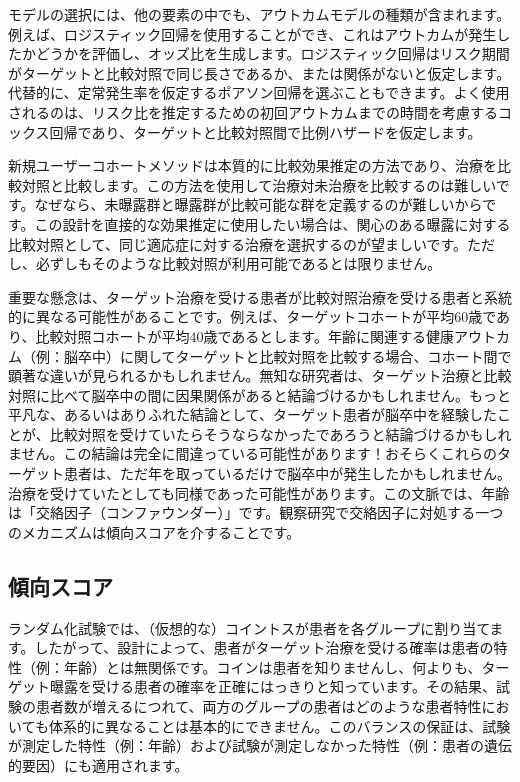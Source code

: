 \documentclass[
  11pt]{book}
\makeatletter
\newenvironment{kframe}{%
\medskip{}
\setlength{\fboxsep}{.8em}
 \def\at@end@of@kframe{}%
 \ifinner\ifhmode%
  \def\at@end@of@kframe{\end{minipage}}%
  \begin{minipage}{\columnwidth}%
 \fi\fi%
 \def\FrameCommand##1{\hskip\@totalleftmargin \hskip-\fboxsep
 \colorbox{myShadeColor}{##1}\hskip-\fboxsep
     \hskip-\linewidth \hskip-\@totalleftmargin \hskip\columnwidth}%
 \MakeFramed {\advance\hsize-\width
   \@totalleftmargin\z@ \linewidth\hsize
   \@setminipage}}%
 {\par\unskip\endMakeFramed%
 \at@end@of@kframe}
\newenvironment{rmdblock}[1]
  {
  \begin{itemize}
  \renewcommand{\labelitemi}{
    \raisebox{-.7\height}[0pt][0pt]{
      {\setkeys{Gin}{width=3em,keepaspectratio}\texttt{[image: images/\#1]}}
    }
  }
  \setlength{\fboxsep}{1em}
  \begin{kframe}
  \item
  }
  {
  \end{kframe}
  \end{itemize}
  }
\newenvironment{rmdimportant}
  {\begin{rmdblock}{important}}
  {\end{rmdblock}}
\theoremstyle{definition}
\theoremstyle{definition}
\theoremstyle{definition}
\theoremstyle{definition}
\theoremstyle{remark}
\makeatother
\begin{document}
モデルの選択には、他の要素の中でも、アウトカムモデルの種類が含まれます。例えば、ロジスティック回帰を使用することができ、これはアウトカムが発生したかどうかを評価し、オッズ比を生成します。ロジスティック回帰はリスク期間がターゲットと比較対照で同じ長さであるか、または関係がないと仮定します。代替的に、定常発生率を仮定するポアソン回帰を選ぶこともできます。よく使用されるのは、リスク比を推定するための初回アウトカムまでの時間を考慮するコックス回帰であり、ターゲットと比較対照間で比例ハザードを仮定します。    

\begin{rmdimportant}
新規ユーザーコホートメソッドは本質的に比較効果推定の方法であり、治療を比較対照と比較します。この方法を使用して治療対未治療を比較するのは難しいです。なぜなら、未曝露群と曝露群が比較可能な群を定義するのが難しいからです。この設計を直接的な効果推定に使用したい場合は、関心のある曝露に対する比較対照として、同じ適応症に対する治療を選択するのが望ましいです。ただし、必ずしもそのような比較対照が利用可能であるとは限りません。
\end{rmdimportant}

重要な懸念は、ターゲット治療を受ける患者が比較対照治療を受ける患者と系統的に異なる可能性があることです。例えば、ターゲットコホートが平均60歳であり、比較対照コホートが平均40歳であるとします。年齢に関連する健康アウトカム（例：脳卒中）に関してターゲットと比較対照を比較する場合、コホート間で顕著な違いが見られるかもしれません。無知な研究者は、ターゲット治療と比較対照に比べて脳卒中の間に因果関係があると結論づけるかもしれません。もっと平凡な、あるいはありふれた結論として、ターゲット患者が脳卒中を経験したことが、比較対照を受けていたらそうならなかったであろうと結論づけるかもしれません。この結論は完全に間違っている可能性があります！おそらくこれらのターゲット患者は、ただ年を取っているだけで脳卒中が発生したかもしれません。治療を受けていたとしても同様であった可能性があります。この文脈では、年齢は「交絡因子（コンファウンダー）」です。観察研究で交絡因子に対処する一つのメカニズムは傾向スコアを介することです。 

\subsection{傾向スコア}\label{ux50beux5411ux30b9ux30b3ux30a2}


ランダム化試験では、（仮想的な）コイントスが患者を各グループに割り当てます。したがって、設計によって、患者がターゲット治療を受ける確率は患者の特性（例：年齢）とは無関係です。コインは患者を知りませんし、何よりも、ターゲット曝露を受ける患者の確率を正確にはっきりと知っています。その結果、試験の患者数が増えるにつれて、両方のグループの患者はどのような患者特性においても体系的に異なることは基本的にできません。このバランスの保証は、試験が測定した特性（例：年齢）および試験が測定しなかった特性（例：患者の遺伝的要因）にも適用されます。 
\end{document}
